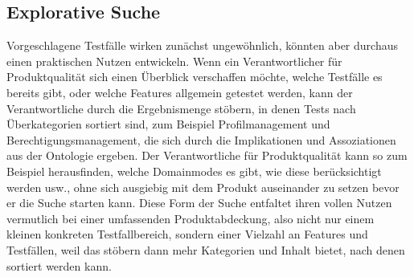 \subsection*{Explorative Suche}
\glqq Vorgeschlagene\grqq{} Testfälle wirken zunächst ungewöhnlich, könnten aber durchaus einen praktischen Nutzen entwickeln. Wenn ein Verantwortlicher für Produktqualität sich einen Überblick verschaffen möchte, welche Testfälle es bereits gibt, oder welche Features allgemein getestet werden, kann der Verantwortliche durch die Ergebnismenge stöbern, in denen Tests nach Überkategorien sortiert sind, zum Beispiel Profilmanagement und Berechtigungsmanagement, die sich durch die Implikationen und Assoziationen aus der Ontologie ergeben. Der Verantwortliche für Produktqualität kann so zum Beispiel herausfinden, welche Domainmodes es gibt, wie diese berücksichtigt werden usw., ohne sich ausgiebig mit dem Produkt auseinander zu setzen bevor er die Suche starten kann. Diese Form der Suche entfaltet ihren vollen Nutzen vermutlich bei einer umfassenden Produktabdeckung, also nicht nur einem kleinen konkreten Testfallbereich, sondern einer Vielzahl an Features und Testfällen, weil das \glqq stöbern\grqq{} dann mehr Kategorien und Inhalt bietet, nach denen sortiert werden kann.
